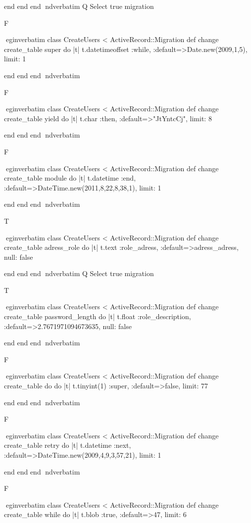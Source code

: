     end 
  end 
end
nd{verbatim}
Q
 Select true migration

F

egin{verbatim}
 class CreateUsers < ActiveRecord::Migration 
  def change 
    create_table super do |t| 
      t.datetimeoffset :while, :default=>Date.new(2009,1,5), limit: 1
    
    end 
  end 
end
nd{verbatim}

F

egin{verbatim}
 class CreateUsers < ActiveRecord::Migration 
  def change 
    create_table yield do |t| 
      t.char :then, :default=>"JtYntcCj", limit: 8
    
    end 
  end 
end
nd{verbatim}

F

egin{verbatim}
 class CreateUsers < ActiveRecord::Migration 
  def change 
    create_table module do |t| 
      t.datetime :end, :default=>DateTime.new(2011,8,22,8,38,1), limit: 1
    
    end 
  end 
end
nd{verbatim}

T

egin{verbatim}
 class CreateUsers < ActiveRecord::Migration 
  def change 
    create_table adress_role do |t| 
      t.text :role_adress, :default=>adress_adress, null: false
    
    end 
  end 
end
nd{verbatim}
Q
 Select true migration

T

egin{verbatim}
 class CreateUsers < ActiveRecord::Migration 
  def change 
    create_table password_length do |t| 
      t.float :role_description, :default=>2.7671971094673635, null: false
    
    end 
  end 
end
nd{verbatim}

F

egin{verbatim}
 class CreateUsers < ActiveRecord::Migration 
  def change 
    create_table do do |t| 
      t.tinyint(1) :super, :default=>false, limit: 77
    
    end 
  end 
end
nd{verbatim}

F

egin{verbatim}
 class CreateUsers < ActiveRecord::Migration 
  def change 
    create_table retry do |t| 
      t.datetime :next, :default=>DateTime.new(2009,4,9,3,57,21), limit: 1
    
    end 
  end 
end
nd{verbatim}

F

egin{verbatim}
 class CreateUsers < ActiveRecord::Migration 
  def change 
    create_table while do |t| 
      t.blob :true, :default=>47, limit: 6
    

